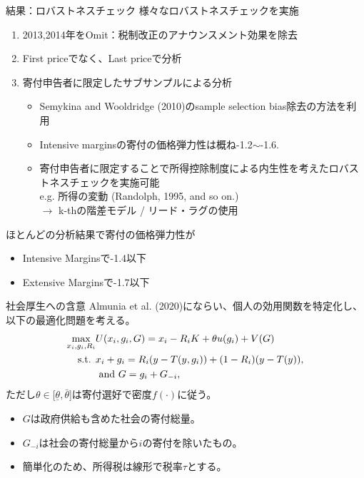 \documentclass[dvipdfmx,10pt]{beamer}
\begin{document}
\begin{frame}{結果：ロバストネスチェック}
 様々なロバストネスチェックを実施
		\begin{enumerate}
			\item 2013,2014年をOmit：税制改正のアナウンスメント効果を除去
			\item First priceでなく、Last priceで分析
			\item 寄付申告者に限定したサブサンプルによる分析
			\begin{itemize}
				\item Semykina and Wooldridge (2010)のsample selection bias除去の方法を利用
				\item Intensive marginsの寄付の価格弾力性は概ね-1.2\(\sim\)-1.6.
				\item 寄付申告者に限定することで所得控除制度による内生性を考えたロバストネスチェックを実施可能\\
				e.g. 所得の変動 (Randolph, 1995, and so on.)\\
				$\to$ k-thの階差モデル / リード・ラグの使用  
			\end{itemize}
		\end{enumerate}
		ほとんどの分析結果で寄付の価格弾力性が
		\begin{itemize}
			\item Intensive Marginsで-1.4以下 
			\item Extensive Marginsで-1.7以下
		\end{itemize}
\end{frame}

\begin{frame}{社会厚生への含意}
	Almunia et al. (2020)にならい、個人の効用関数を特定化し、以下の最適化問題を考える。
	\begin{align}
		\max_{x_i,g_i,R_i}&U(x_i,g_i,G)= x_i - R_iK +\theta u(g_i) + V(G)\notag\\
		\text{s.t. }&x_i + g_i = R_i(y-T(y, g_i)) + (1-R_i)(y-T(y)),\notag\\
		&\text{ and }G=g_i+G_{-i}\notag,
	\end{align}
	ただし$\theta\in[\underline{\theta},\bar{\theta}$]は寄付選好で密度$f(\cdot)$に従う。 
	\begin{itemize}
		\item $G$は政府供給も含めた社会の寄付総量。
		\item $G_{-i}$は社会の寄付総量から$i$の寄付を除いたもの。
		\item 簡単化のため、所得税は線形で税率$\tau$とする。
	\end{itemize}
\end{frame}
\end{document}
